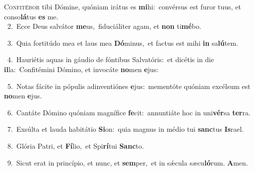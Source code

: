 \lettrine{\initial\textcolor{\initialcolor}{C}}{onfitébor} tibi Dómine, quóniam irátus es \textbf{mi}\-hi:~\star convérsus est furor tuus, et conso\-\textbf{lá}\-tus \textbf{es} me.\\
{\numbfont\textcolor{\numbcolor}{~2.}}~Ecce Deus salvátor \textbf{me}\-us,~\star fiduciáliter agam, et \textbf{non} ti\-\textbf{mé}\-bo.\par
{\numbfont\textcolor{\numbcolor}{~3.}}~Quia fortitúdo mea et laus mea \textbf{Dó}\-minus,~\star et factus est mihi \textbf{in} sa\-\textbf{lú}\-tem.\par
{\numbfont\textcolor{\numbcolor}{~4.}}~Hauriétis aquas in gáudio de fóntibus Salvatóris:~\dagger et dicétis in die \textbf{il}\-la:~\star Confitémini Dómino, et invocáte \textbf{no}\-men \textbf{e}\-jus:\par
{\numbfont\textcolor{\numbcolor}{~5.}}~Notas fácite in pópulis adinventiónes \textbf{e}\-jus:~\star mementóte quóniam excélsum est \textbf{no}\-men \textbf{e}\-jus.\par
{\numbfont\textcolor{\numbcolor}{~6.}}~Cantáte Dómino quóniam magnífice \textbf{fe}\-cit:~\star annuntiáte hoc in uni\-\textbf{vér}\-sa \textbf{ter}\-ra.\par
{\numbfont\textcolor{\numbcolor}{~7.}}~Exsúlta et lauda habitátio \textbf{Si}\-on:~\star quia magnus in médio tui \textbf{sanc}\-tus \textbf{Is}\-rael.\par
{\numbfont\textcolor{\numbcolor}{~8.}}~Glória Patri, et \textbf{Fí}\-lio,~\star et Spi\-\textbf{rí}\-tui \textbf{Sanc}\-to.\par
{\numbfont\textcolor{\numbcolor}{~9.}}~Sicut erat in princípio, et nunc, et \textbf{sem}\-per,~\star et in sǽcula sæcu\-\textbf{ló}\-rum. \textbf{A}\-men.\par
